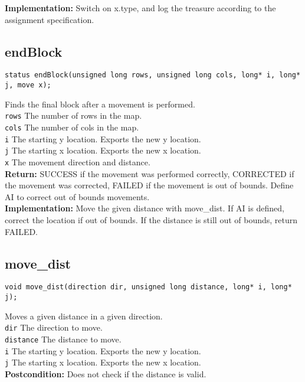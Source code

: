 \documentclass{article}
\begin{document}
 
 \textbf{Implementation:}
Switch on  x.type, and log the treasure according to the assignment specification.


\subsection{endBlock}
\begin{lstlisting}
status endBlock(unsigned long rows, unsigned long cols, long* i, long* j, move x);
\end{lstlisting}


 Finds the final block after a movement is performed.\\ 
 \texttt{rows} The number of rows in the map.\\ 
 \texttt{cols} The number of cols in the map.\\ 
 \texttt{i} The starting y location. Exports the new y location.\\ 
 \texttt{j} The starting x location. Exports the new x location.\\ 
 \texttt{x} The movement direction and distance.\\ 
 \textbf{Return:} SUCCESS if the movement was performed correctly,
         CORRECTED if the movement was corrected,
         FAILED if the movement is out of bounds.
 Define AI to correct out of bounds movements.\\ 
 
 
 \textbf{Implementation:}
Move the given distance with  move\_dist.
If AI is defined, correct the location if out of bounds.
If the distance is still out of bounds, return FAILED.


\subsection{move\_dist}
\begin{lstlisting}
void move_dist(direction dir, unsigned long distance, long* i, long* j);
\end{lstlisting}


 Moves a given distance in a given direction.\\ 
 \texttt{dir} The direction to move.\\ 
 \texttt{distance} The distance to move.\\ 
 \texttt{i} The starting y location. Exports the new y location.\\ 
 \texttt{j} The starting x location. Exports the new x location.\\ 
 \textbf{Postcondition:} Does not check if the distance is valid.\\ 
 
\end{document}
